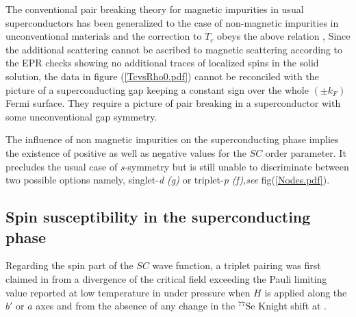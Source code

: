 \documentclass[11pt]{article} %
\begin{document}
The conventional pair breaking theory for magnetic impurities in usual superconductors has been generalized to
the case of non-magnetic impurities in unconventional materials and the correction to $T_c$ obeys the above relation \cite{Maki04,Larkin65},
Since the additional scattering cannot be ascribed to magnetic scattering according to the  EPR checks
 showing no additional traces of localized spins in  the solid solution, the data in figure (\ref{TcvsRho0.pdf}) 
 cannot be reconciled with the picture of a superconducting gap keeping a constant sign over the whole
$(\pm k_F)$ Fermi surface. They require a picture of pair breaking in a superconductor with some unconventional gap
symmetry. 

  The influence of non magnetic impurities on the superconducting phase implies the existence of  positive as well as negative values for the $SC$  order parameter. It precludes the usual case of \textit{s}-symmetry but is still unable to 
 discriminate between  two possible options namely,  singlet-\textit{d (g)} or triplet-\textit{p (f)}\cite{Nickel05},\textit{see} fig(\ref{Nodes.pdf}). 

\subsection{Spin susceptibility in the superconducting phase}
Regarding the spin part of the $SC$ wave function, a triplet pairing was first claimed in  from a divergence of the critical field  exceeding the Pauli limiting value reported at low temperature in  under pressure when $H$ is applied along the $b'$ or $a$ axes \cite{Lee97} and from the absence of any change in the $^{77}\mathrm{Se}$ Knight shift at \tc \cite{Lee01}. 
\end{document}
